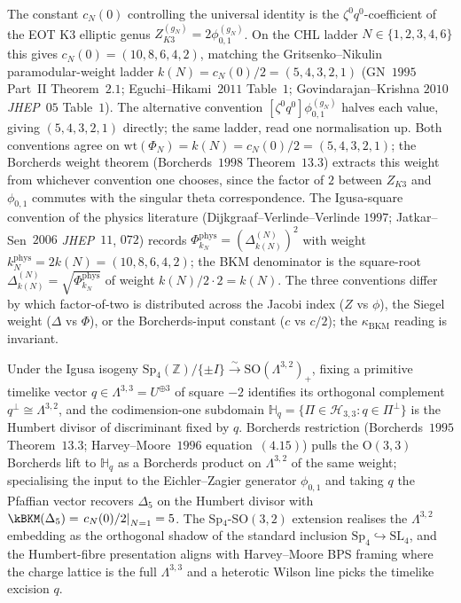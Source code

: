 \begin{remark}
\label{rem:k3e-adjudication-two-conventions}
The constant $c_N(0)$ controlling the universal identity is
the $\zeta^0 q^0$-coefficient of the EOT K3 elliptic genus
$Z^{(g_N)}_{K3} = 2\phi^{(g_N)}_{0, 1}$. On the CHL ladder
$N \in \{1, 2, 3, 4, 6\}$ this gives $c_N(0) = (10, 8, 6, 4, 2)$,
matching the Gritsenko--Nikulin paramodular-weight ladder
$k(N) = c_N(0)/2 = (5, 4, 3, 2, 1)$ (GN~$1995$ Part~II
Theorem~$2.1$; Eguchi--Hikami~$2011$ Table~$1$; Govindarajan--Krishna
$2010$ \emph{JHEP}~$05$ Table~$1$). The alternative convention
$[\zeta^0 q^0] \phi^{(g_N)}_{0, 1}$ halves each value,
giving $(5, 4, 3, 2, 1)$ directly; the same ladder, read
one normalisation up. Both conventions agree on
$\mathrm{wt}(\Phi_N) = k(N) = c_N(0)/2 = (5, 4, 3, 2, 1)$;
the Borcherds weight theorem (Borcherds~$1998$ Theorem~$13.3$)
extracts this weight from whichever convention one chooses,
since the factor of $2$ between $Z_{K3}$ and $\phi_{0, 1}$
commutes with the singular theta correspondence. The Igusa-square
convention of the physics literature (Dijkgraaf--Verlinde--Verlinde
$1997$; Jatkar--Sen~$2006$ \emph{JHEP}~$11$, $072$) records
$\Phi^{\mathrm{phys}}_{k_N} = (\Delta_{k(N)}^{(N)})^2$ with
weight $k_N^{\mathrm{phys}} = 2 k(N) = (10, 8, 6, 4, 2)$; the BKM
denominator is the square-root
$\Delta_{k(N)}^{(N)} = \sqrt{\Phi^{\mathrm{phys}}_{k_N}}$ of
weight $k(N)/2 \cdot 2 = k(N)$. The three conventions differ by
which factor-of-two is distributed across the Jacobi index
($Z$ vs $\phi$), the Siegel weight ($\Delta$ vs $\Phi$), or the
Borcherds-input constant ($c$ vs $c/2$); the $\kappa_{\mathrm{BKM}}$
reading is invariant.
\end{remark}

\begin{remark}
\label{rem:humbert-envelope-restriction}
Under the Igusa isogeny $\mathrm{Sp}_4(\mathbb{Z})/\{\pm I\} \xrightarrow{\sim} \mathrm{SO}(\Lambda^{3, 2})_+$, fixing a primitive timelike vector $q \in \Lambda^{3, 3} = U^{\oplus 3}$ of square $-2$ identifies its orthogonal complement $q^\perp \cong \Lambda^{3, 2}$, and the codimension-one subdomain $\mathbb{H}_q = \{\Pi \in \mathcal{H}_{3, 3} : q \in \Pi^\perp\}$ is the Humbert divisor of discriminant fixed by $q$. Borcherds restriction (Borcherds~$1995$ Theorem~$13.3$; Harvey--Moore~$1996$ equation~$(4.15)$) pulls the $\mathrm{O}(3, 3)$ Borcherds lift to $\mathbb{H}_q$ as a Borcherds product on $\Lambda^{3, 2}$ of the same weight; specialising the input to the Eichler--Zagier generator $\phi_{0, 1}$ and taking $q$ the Pfaffian vector recovers $\Delta_5$ on the Humbert divisor with $\kBKM(\Delta_5) = \left.c_N(0)/2\right|_{N=1} = 5$. The Sp$_4$-SO$(3, 2)$ extension realises the $\Lambda^{3, 2}$ embedding as the orthogonal shadow of the standard inclusion $\mathrm{Sp}_4 \hookrightarrow \mathrm{SL}_4$, and the Humbert-fibre presentation aligns with Harvey--Moore BPS framing where the charge lattice is the full $\Lambda^{3, 3}$ and a heterotic Wilson line picks the timelike excision $q$.
\end{remark}

